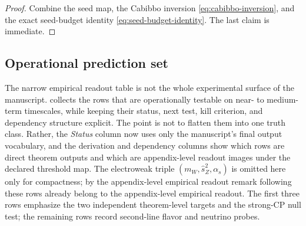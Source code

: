 \begin{proof}
Combine the seed map, the Cabibbo inversion \eqref{eq:cabibbo-inversion}, and the exact
seed-budget identity \eqref{eq:seed-budget-identity}. The last claim is immediate.
\end{proof}

\subsection{Operational prediction set}

The narrow empirical readout table is not the whole experimental surface of the manuscript.
 collects the rows that are operationally testable on near-
to medium-term timescales, while keeping their status, next test, kill criterion, and dependency
structure explicit. The point is not to flatten them into one truth class. Rather, the
\emph{Status} column now uses only the manuscript's final output vocabulary, and the derivation
and dependency columns show which rows are direct theorem outputs and which are appendix-level
readout images under the declared threshold map. The electroweak triple
$(m_W,\hat s_Z^2,\alpha_s)$ is omitted here only for compactness; by
the appendix-level empirical readout remark following  these rows
already belong to the appendix-level empirical readout. The first three rows emphasize the two
independent theorem-level targets and the strong-CP null test; the remaining rows record
second-line flavor and neutrino probes.


